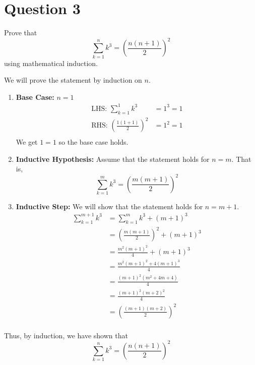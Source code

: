 \documentclass{article}
\begin{document}
\section{Question 3}
Prove that $$\sum_{k = 1}^{n}k^3 = \left(\frac{n(n + 1)}{2}\right)^2$$ using mathematical induction.
\begin{proofbox}
    We will prove the statement by induction on $n$.
    \begin{enumerate}
        \item \textbf{Base Case:} $n = 1$ \\ 
        \begin{align*}
            \text{LHS: } \sum_{k = 1}^{1}k^3 &= 1^3 = 1 \\ 
            \text{RHS: } \left(\frac{1(1 + 1)}{2}\right)^2 &= 1^2 = 1 \\
        \end{align*} We get $ 1 = 1$ so the base case holds.
        \item \textbf{Inductive Hypothesis:} Assume that the statement holds for $n = m$. That is, $$\sum_{k = 1}^{m}k^3 = \left(\frac{m(m + 1)}{2}\right)^2$$
        \item \textbf{Inductive Step:} We will show that the statement holds for $n = m + 1$.
        \begin{align*}
            \sum_{k = 1}^{m + 1}k^3 &= \sum_{k = 1}^{m}k^3 + (m + 1)^3 \\ 
            &= \left(\frac{m(m + 1)}{2}\right)^2 + (m + 1)^3 \\ 
            &= \frac{m^2(m + 1)^2}{4} + (m + 1)^3 \\ 
            &= \frac{m^2(m + 1)^2 + 4(m + 1)^3}{4} \\ 
            &= \frac{(m + 1)^2(m^2 + 4m + 4)}{4} \\ 
            &= \frac{(m + 1)^2(m + 2)^2}{4} \\ 
            &= \left(\frac{(m + 1)(m + 2)}{2}\right)^2 \\
        \end{align*}
    \end{enumerate}
    Thus, by induction, we have shown that $$\sum_{k = 1}^{n}k^3 = \left(\frac{n(n + 1)}{2}\right)^2$$
\end{proofbox}
\end{document}
